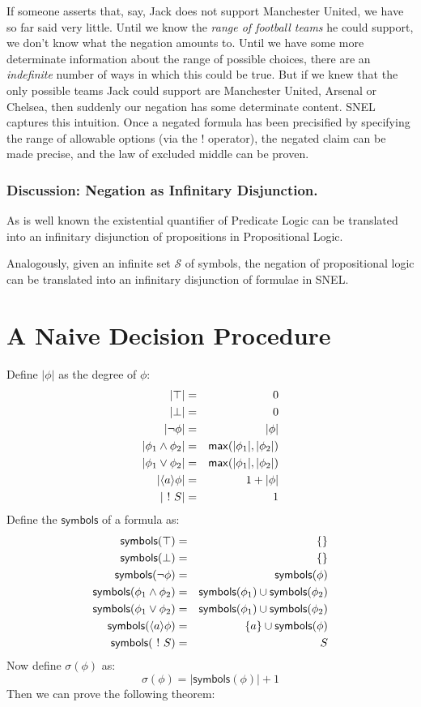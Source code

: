 \NI If someone asserts that, say, Jack does not support Manchester United,
we have so far said very little.  Until we know the \emph{range of
  football teams} he could support, we don't know what the negation
amounts to.  Until we have some more determinate information about the
range of possible choices, there are an \emph{indefinite} number of
ways in which this could be true.  But if we knew that the only
possible teams Jack could support are Manchester United, Arsenal or
Chelsea, then suddenly our negation has some determinate content.
SNEL captures this intuition.  Once a negated formula has been
precisified by specifying the range of allowable options (via the $!$
operator), the negated claim can be made precise, and the law of
excluded middle can be proven.

\subsubsection{Discussion: Negation as Infinitary Disjunction. }
As is well known the existential quantifier of Predicate Logic can be translated into an infinitary disjunction of propositions in Propositional Logic.

Analogously, given an infinite set $\mathcal{S}$ of symbols, the negation of propositional logic can be translated into an infinitary disjunction of formulae in SNEL.



\section{A Naive Decision Procedure}
Define $|\phi|$ as the degree of $\phi$:
\begin{eqnarray*}
|\top| & = & 0  \\
|\bot| & = & 0  \\
|\neg \phi| & = & | \phi |  \\
|\phi_1 \land \phi_2| & = & \mathsf{max}(| \phi_1 |, | \phi_2|)  \\
|\phi_1 \lor \phi_2| & = & \mathsf{max}(| \phi_1 |, | \phi_2|)  \\
|\langle a \rangle \phi | & = & 1 + | \phi |  \\
| \ ! \  S | & = & 1 
\end{eqnarray*}
Define the $\mathsf{symbols}$ of a formula as:
\begin{eqnarray*}
\mathsf{symbols}(\top) & = & \{\}  \\
\mathsf{symbols}(\bot) & = & \{\}  \\
\mathsf{symbols}(\neg \phi) & = & \mathsf{symbols}(\phi)  \\
\mathsf{symbols}(\phi_1 \land \phi_2) & = &\mathsf{symbols}(\phi_1) \cup \mathsf{symbols}(\phi_2)  \\
\mathsf{symbols}(\phi_1 \lor \phi_2) & = &\mathsf{symbols}(\phi_1) \cup \mathsf{symbols}(\phi_2)  \\
\mathsf{symbols}(\langle a \rangle \phi) & = & \{a\} \cup \mathsf{symbols}(\phi)  \\
\mathsf{symbols}(\ ! \  S) & = & S 
\end{eqnarray*}
Now define $\sigma(\phi)$ as:
\[
\sigma(\phi) = |\mathsf{symbols}(\phi)| + 1
\]
Then we can prove the following theorem:

